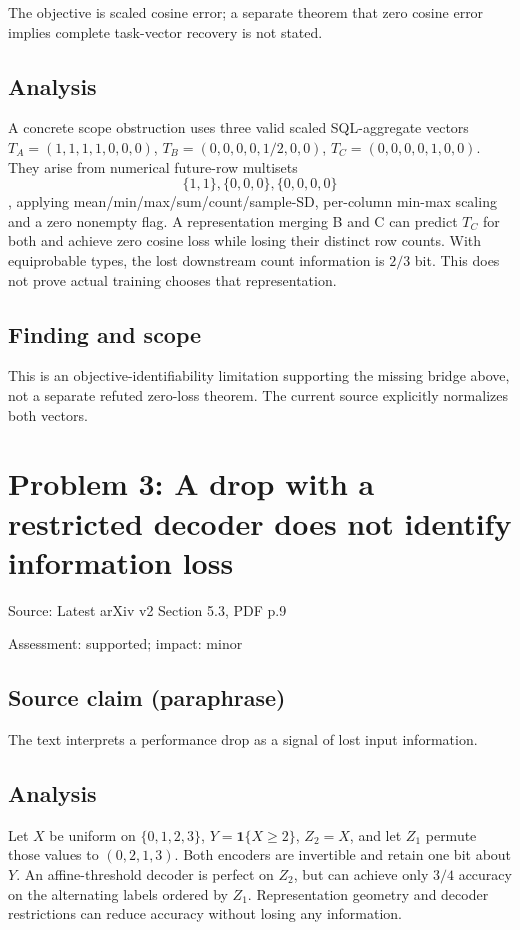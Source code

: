 \documentclass[11pt]{article}
\begin{document}
The objective is scaled cosine error; a separate theorem that zero cosine error implies complete task-vector recovery is not stated.

\subsection*{Analysis}

A concrete scope obstruction uses three valid scaled SQL-aggregate vectors \(T_A=(1,1,1,1,0,0,0)\), \(T_B=(0,0,0,0,1/2,0,0)\), \(T_C=(0,0,0,0,1,0,0)\). They arise from numerical future-row multisets \[\{1,1\},\{0,0,0\},\{0,0,0,0\}\], applying mean/min/max/sum/count/sample-SD, per-column min-max scaling and a zero nonempty flag. A representation merging B and C can predict \(T_C\) for both and achieve zero cosine loss while losing their distinct row counts. With equiprobable types, the lost downstream count information is \(2/3\) bit. This does not prove actual training chooses that representation.

\subsection*{Finding and scope}

This is an objective-identifiability limitation supporting the missing bridge above, not a separate refuted zero-loss theorem. The current source explicitly normalizes both vectors.

\section*{Problem 3: A drop with a restricted decoder does not identify information loss}

Source: Latest arXiv v2 Section 5.3, PDF p.9

Assessment: supported; impact: minor

\subsection*{Source claim (paraphrase)}

The text interprets a performance drop as a signal of lost input information.

\subsection*{Analysis}

Let \(X\) be uniform on \(\{0,1,2,3\}\), \(Y=\mathbf1\{X\geq2\}\), \(Z_2=X\), and let \(Z_1\) permute those values to \((0,2,1,3)\). Both encoders are invertible and retain one bit about \(Y\). An affine-threshold decoder is perfect on \(Z_2\), but can achieve only \(3/4\) accuracy on the alternating labels ordered by \(Z_1\). Representation geometry and decoder restrictions can reduce accuracy without losing any information.
\end{document}
